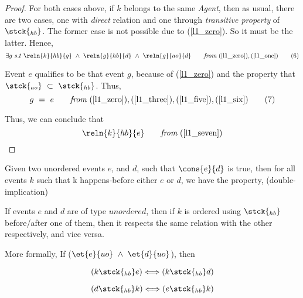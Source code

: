 \begin{proof}
        For both cases above, if $k$ belongs to the same \textit{Agent}, then as usual, there are two cases, one with \textit{direct} relation and one through \textit{transitive property} of $\stck{_{hb}}$. The former case is not possible due to (\ref{l1_zero}). So it must be the latter. Hence,
        \[
            \exists g \ s.t \ 
            \reln{k}{hb}{g} \ \wedge \ \reln{g}{hb}{d} \ \wedge \ \reln{g}{ao}{d} \qquad
            \textit{from} \
            (\ref{l1_zero}), 
            (\ref{l1_one})
            \tag{6}
            \label{l1_six}
        \]
    
        Event $e$ qualifies to be that event $g$, because of (\ref{l1_zero}) and the property that $\stck{_{ao}} \ \subset \ \stck{_{hb}}$. Thus,
        \[
            g \ = \ e \qquad 
            \textit{from} \
            (\ref{l1_zero}), 
            (\ref{l1_three}), 
            (\ref{l1_five}),
            (\ref{l1_six})
            \tag{7}
            \label{l1_seven}
        \]
        
        Thus, we can conclude that
        \[
            \reln{k}{hb}{e} \qquad
            \textit{from} \
            (\ref{l1_seven})
        \]
        
        
        
    \end{proof}







    \begin{lemma}
    Given two unordered events $e$, and $d$, such that $\cons{e}{d}$ is true, then for all events $k$ such that k happens-before either $e$ or $d$, we have the property, (double-implication)
    
         If events $e$ and $d$ are of type $unordered$, then if $k$ is ordered using $\stck{_{hb}}$ before/after one of them, then it respects the same relation with the other respectively, and vice versa.  
         
         More formally, 
         If ($\et{e}{uo} \ \wedge \ \et{d}{uo}$), then
                
                \[
                    (k \stck{_{hb}} e) 
                    \Longleftrightarrow
                    (k \stck{_{hb}} d) 
                \]
                
                \[
                    (d \stck{_{hb}} k) 
                    \Longleftrightarrow
                    (e \stck{_{hb}} k) 
                \]
    \end{lemma}
    
